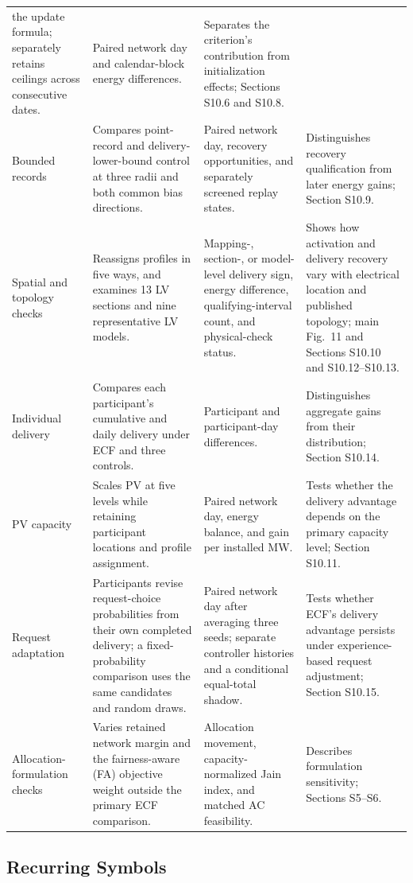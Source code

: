 \documentclass[11pt]{article}
\begin{document}
\begin{table}[!ht]
\begin{tabularx}{\textwidth}{@{}>{\raggedright\arraybackslash}p{}>{\raggedright\arraybackslash}p{}>{\raggedright\arraybackslash}p{}>{\raggedright\arraybackslash}X@{}}
the update formula; separately retains ceilings across consecutive dates. &
Paired network day and calendar-block energy differences. & Separates the
criterion's contribution from initialization effects; Sections S10.6 and S10.8. \\
Bounded records & Compares point-record and delivery-lower-bound control at
three radii and both common bias directions. & Paired network day, recovery
opportunities, and separately screened replay states. & Distinguishes recovery
qualification from later energy gains; Section S10.9. \\
Spatial and topology checks & Reassigns profiles in five ways, and examines
13 LV sections and nine representative LV models. & Mapping-, section-, or model-level delivery sign,
energy difference, qualifying-interval count, and physical-check status. & Shows how activation
and delivery recovery vary with electrical location and published topology;
main Fig.~11 and Sections S10.10 and S10.12--S10.13. \\
Individual delivery & Compares each participant's cumulative and daily delivery
under ECF and three controls. & Participant and participant-day differences. &
Distinguishes aggregate gains from their distribution; Section S10.14. \\
PV capacity & Scales PV at five levels while retaining participant locations
and profile assignment. & Paired network day, energy balance, and gain per
installed MW. & Tests whether the delivery advantage depends on the primary
capacity level; Section S10.11. \\
Request adaptation & Participants revise request-choice probabilities from
their own completed delivery; a fixed-probability comparison uses the same
candidates and random draws. & Paired network day after averaging three seeds;
separate controller histories and a conditional equal-total shadow. & Tests
whether ECF's delivery advantage persists under experience-based request
adjustment; Section S10.15. \\
Allocation-formulation checks & Varies retained network margin and the
fairness-aware (FA) objective weight outside the primary ECF comparison. &
Allocation movement, capacity-normalized Jain index, and matched AC feasibility.
& Describes formulation sensitivity; Sections S5--S6. \\
\bottomrule
\end{tabularx}
\end{table}

\subsection{Recurring Symbols}
\end{document}
